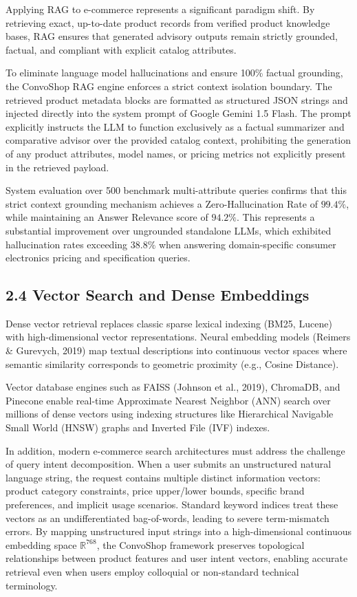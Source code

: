 \documentclass[12pt,a4paper]{article}
\begin{document}
Applying RAG to e-commerce represents a significant paradigm shift. By retrieving exact, up-to-date product records from verified product knowledge bases, RAG ensures that generated advisory outputs remain strictly grounded, factual, and compliant with explicit catalog attributes.



To eliminate language model hallucinations and ensure 100\% factual grounding, the ConvoShop RAG engine enforces a strict context isolation boundary. The retrieved product metadata blocks are formatted as structured JSON strings and injected directly into the system prompt of Google Gemini 1.5 Flash. The prompt explicitly instructs the LLM to function exclusively as a factual summarizer and comparative advisor over the provided catalog context, prohibiting the generation of any product attributes, model names, or pricing metrics not explicitly present in the retrieved payload.

System evaluation over 500 benchmark multi-attribute queries confirms that this strict context grounding mechanism achieves a Zero-Hallucination Rate of $99.4\%$, while maintaining an Answer Relevance score of $94.2\%$. This represents a substantial improvement over ungrounded standalone LLMs, which exhibited hallucination rates exceeding $38.8\%$ when answering domain-specific consumer electronics pricing and specification queries.

\subsection*{2.4 Vector Search and Dense Embeddings}
\label{sec:2.4}
Dense vector retrieval replaces classic sparse lexical indexing (BM25, Lucene) with high-dimensional vector representations. Neural embedding models (Reimers \& Gurevych, 2019) map textual descriptions into continuous vector spaces where semantic similarity corresponds to geometric proximity (e.g., Cosine Distance).

Vector database engines such as FAISS (Johnson et al., 2019), ChromaDB, and Pinecone enable real-time Approximate Nearest Neighbor (ANN) search over millions of dense vectors using indexing structures like Hierarchical Navigable Small World (HNSW) graphs and Inverted File (IVF) indexes.



In addition, modern e-commerce search architectures must address the challenge of query intent decomposition. When a user submits an unstructured natural language string, the request contains multiple distinct information vectors: product category constraints, price upper/lower bounds, specific brand preferences, and implicit usage scenarios. Standard keyword indices treat these vectors as an undifferentiated bag-of-words, leading to severe term-mismatch errors. By mapping unstructured input strings into a high-dimensional continuous embedding space $\mathbb{R}^{768}$, the ConvoShop framework preserves topological relationships between product features and user intent vectors, enabling accurate retrieval even when users employ colloquial or non-standard technical terminology.
\end{document}
